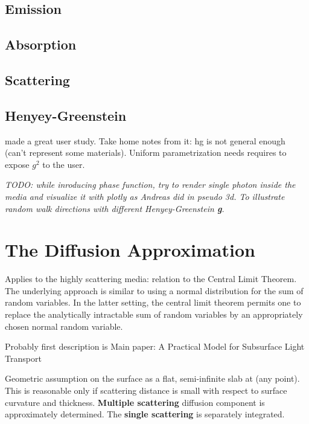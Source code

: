 \subsection{Emission}
\subsection{Absorption}
\subsection{Scattering}

\subsection{Henyey-Greenstein}
\cite{Gkioulekas:2013:IVR:2508363.2508377} made a great user study.
Take home notes from it: \gls{hg} is not general enough (can't represent some
materials). Uniform parametrization needs requires to expose $g^2$ to the user.

\emph{TODO: while inroducing phase function, try to render single photon inside
the media and visualize it with plotly as Andreas did in pseudo 3d. To illustrate
random walk directions with different Henyey-Greenstein \textbf{g}.}

\section{The Diffusion Approximation}
Applies to the highly scattering media: relation to the Central Limit Theorem.
The underlying approach is similar to using a normal distribution for the sum of
random variables.
In the latter setting, the central limit theorem permits one to replace the analytically intractable sum of random variables by
an appropriately chosen normal random variable.

Probably first description is \cite{Stam1995}
Main paper: A Practical Model for Subsurface Light Transport \cite{Jensen:2001:PMS:383259.383319}

Geometric assumption on the surface as a flat, semi-infinite slab at (any
point). This is reasonable only if scattering distance is small with respect to
surface curvature and thickness. \textbf{Multiple scattering} diffusion
component is approximately determined. The \textbf{single scattering} is
separately integrated.
